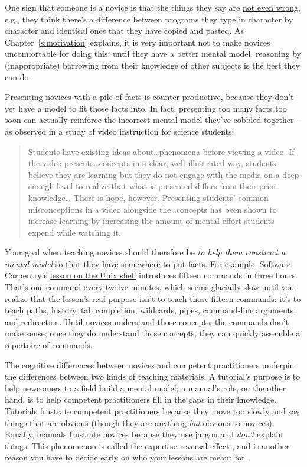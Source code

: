 One sign that someone is a novice is that the things they say are \href{https://en.wikipedia.org/wiki/Not\_even\_wrong}{not
even wrong}, e.g., they think there's a difference
between programs they type in character by character and identical
ones that they have copied and pasted. As Chapter~\ref{s:motivation}
explains, it is very important not to make novices uncomfortable for
doing this: until they have a better mental model, reasoning by
(inappropriate) borrowing from their knowledge of other subjects is
the best they can do.

Presenting novices with a pile of facts is counter-productive, because
they don't yet have a model to fit those facts into. In fact, presenting
too many facts too soon can actually reinforce the incorrect mental
model they've cobbled together---as \cite{Mull2007a} observed in a
study of video instruction for science students:

\begin{quote}\setlength{\parindent}{0pt}
Students have existing ideas about\ldots{}phenomena before
viewing a video. If the video presents\ldots{}concepts in a
clear, well illustrated way, students believe they are learning but
they do not engage with the media on a deep enough level to realize
that what is presented differs from their prior
knowledge\ldots{} There is hope, however. Presenting students'
common misconceptions in a video alongside the\ldots{}concepts
has been shown to increase learning by increasing the amount of mental
effort students expend while watching it.
\end{quote}

Your goal when teaching novices should therefore be \emph{to help them
construct a mental model} so that they have somewhere to put
facts. For example, Software Carpentry's \href{http://swcarpentry.github.io/shell-novice/}{lesson on the Unix
shell} introduces fifteen commands in three
hours. That's one command every twelve minutes, which seems glacially
slow until you realize that the lesson's real purpose isn't to teach
those fifteen commands: it's to teach paths, history, tab completion,
wildcards, pipes, command-line arguments, and redirection. Until
novices understand those concepts, the commands don't make sense; once
they do understand those concepts, they can quickly assemble a
repertoire of commands.

The cognitive differences between novices and competent practitioners
underpin the differences between two kinds of teaching materials. A
tutorial's purpose is to help newcomers to a field build a mental
model; a manual's role, on the other hand, is to help competent
practitioners fill in the gaps in their knowledge. Tutorials frustrate
competent practitioners because they move too slowly and say things
that are obvious (though they are anything \emph{but} obvious to
novices). Equally, manuals frustrate novices because they use jargon
and \emph{don't} explain things. This phenomenon is called the \hyperlink{g:expertise-reversal}{expertise
reversal effect} \cite{Kaly2003}, and is
another reason you have to decide early on who your lessons are meant
for.

